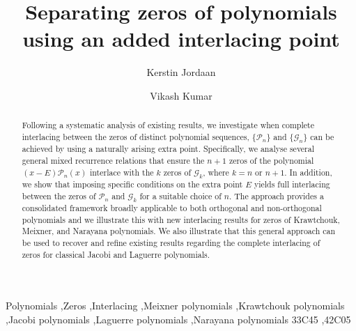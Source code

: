 \documentclass[final,3p,times,12pt]{elsarticle}
\numberwithin{equation}{section}  %
\begin{document}
	
\begin{frontmatter}
\title{Separating zeros of polynomials using an added interlacing point}


\author[label1]{Kerstin Jordaan}
\author[label2]{Vikash Kumar}

\address[label1]{College of Economic and Management Sciences, University of South Africa, Pretoria, 0002, South Africa}
\address[label2]{Department of Decision Sciences, University of South Africa, Pretoria 0002, South Africa}

\begin{abstract}
 Following a systematic analysis of existing results, we investigate when complete interlacing between the zeros of distinct polynomial sequences, $\{\mathcal{P}_n\}$ and $\{\mathcal{G}_n\}$ can be achieved by using a naturally arising extra point. Specifically, we analyse several general mixed recurrence relations that ensure the $n+1$ zeros of the polynomial $(x-E)\mathcal{P}_n(x)$ interlace with the $k$ zeros of $\mathcal{G}_k$, where $k=n$ or $n+1$. In addition, we show that imposing specific conditions on the extra point $E$ yields full interlacing between the zeros of $\mathcal{P}_n$ and $\mathcal{G}_k$ for a suitable choice of $n$. The approach provides a consolidated framework broadly applicable to both orthogonal and non-orthogonal polynomials and we illustrate this with new interlacing results for zeros of Krawtchouk, Meixner, and Narayana polynomials. We also illustrate that this general approach can be used to recover and refine existing results regarding the complete interlacing of zeros for classical Jacobi and Laguerre polynomials.
\end{abstract}


\begin{keyword}
Polynomials  \sep Zeros \sep Interlacing \sep Meixner polynomials \sep Krawtchouk polynomials \sep Jacobi polynomials \sep Laguerre polynomials  \sep Narayana polynomials
\MSC[2020] 33C45 \sep 42C05
\end{keyword}

\end{frontmatter}
\end{document}

